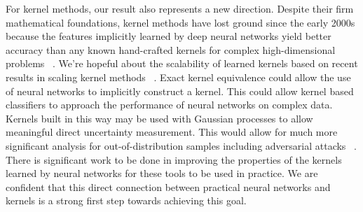 For kernel methods, our result also represents a new direction. Despite their firm mathematical foundations, kernel methods have lost ground since the early 2000s because the features implicitly learned by deep neural networks yield better accuracy than any known hand-crafted kernels for complex high-dimensional problems ~\cite{NIPS2005_663772ea}. 
We're hopeful about the scalability of learned kernels based on recent results in scaling kernel methods  ~\cite{snelson2005sparse}. 
Exact kernel equivalence could allow the use of neural networks to implicitly construct a kernel. 
This could allow kernel based classifiers to approach the performance of neural networks on complex data. 
Kernels built in this way may be used with Gaussian processes to allow meaningful direct uncertainty measurement. 
This would allow for much more significant analysis for out-of-distribution samples including adversarial attacks ~\cite{szegedy2013intriguing, ilyas2019adversarial}. 
There is significant work to be done in improving the properties of the kernels learned by neural networks for these tools to be used in practice.
We are confident that this direct connection between practical neural networks and kernels is a strong first step towards achieving this goal.



